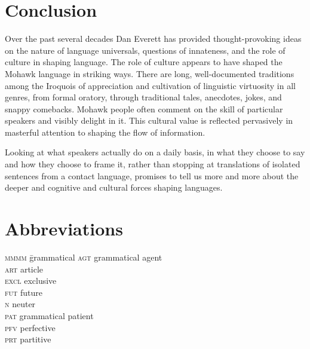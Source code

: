 \documentclass[output=paper,colorlinks,citecolor=brown]{langscibook}
\begin{document}
\section{Conclusion}

Over the past several decades Dan Everett has provided thought-provoking ideas on the nature of language universals, questions of innateness, and the role of culture in shaping language. The role of culture appears to have shaped the Mohawk language in striking ways. There are long, well-documented traditions among the Iroquois of appreciation and cultivation of linguistic virtuosity in all genres, from formal oratory, through traditional tales, anecdotes, jokes, and snappy comebacks. Mohawk people often comment on the skill of particular speakers and visibly delight in it. This cultural value is reflected pervasively in masterful attention to shaping the flow of information.

Looking at what speakers actually do on a daily basis, in what they choose to say and how they choose to frame it, rather than stopping at translations of isolated sentences from a contact language, promises to tell us more and more about the deeper and cognitive and cultural forces shaping languages.

\section*{Abbreviations}

\begin{multicols}{2}
\begin{tabbing}
\textsc{mmmm} \= grammatical\kill
\textsc{agt}  \> grammatical agent\\
\textsc{art}  \> article\\
\textsc{excl} \> exclusive\\
\textsc{fut}  \> future\\
\textsc{n}    \> neuter\\
\textsc{pat}  \> grammatical patient\\
\textsc{pfv}  \> perfective\\
\textsc{prt}  \> partitive
\end{tabbing}
\end{multicols}


\printbibliography[heading=subbibliography,notkeyword=this]
\end{document}
